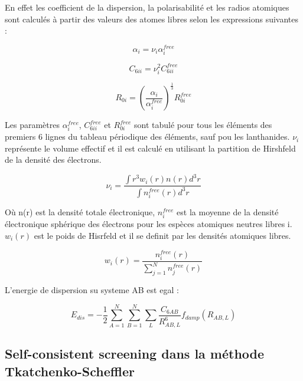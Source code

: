 	En effet les coefficient de la dispersion, la polarisabilité et les radios atomiques sont calculés à partir des valeurs des atomes libres selon les expressions suivantes :
	
	\begin{equation}
	\alpha_{i} = \nu_{i} \alpha_{i}^{free}
	\end{equation}
	
	\begin{equation}
	C_{6ii} = \nu_{i}^{2} C_{6ii}^{free}
	\end{equation}
	
	\begin{equation}
	R_{0i} = \left(\frac{\alpha_{i}}{\alpha_{i}^{free}}\right)^{\frac{1}{3}} R_{0i}^{free}
	\end{equation}
	
	Les paramètres $\alpha_{i}^{free}$, $C_{6ii}^{free}$ et $R_{0i}^{free}$ sont tabulé pour tous les éléments des premiers 6 lignes du tableau périodique des éléments, sauf pou les lanthanides. $\nu_{i}$ représente le volume effectif et il est calculé en utilisant la partition de Hirshfeld de la densité des électrons. 
	
	\begin{equation}
	\nu_{i} = \frac{\int r^{3} w_{i}(r)n(r)d^{3}r}{\int n_{i}^{free} (r)d^{3}r}
	\end{equation}
	
	Où n(r) est la densité totale électronique, $n_{i}^{free}$ est la moyenne de la densité électronique sphérique des électrons pour les espèces atomiques neutres libres i. $w_{i}(r)$ est le poids de Hisrfeld et il se definit par les densités atomiques libres.
	
	\begin{equation}
	w_{i}(r)= \frac{n_{i}^{free}(r)}{\sum_{j=1}^{N} n_{j}^{free}(r)}
	\end{equation}
	\bigskip
	
	L'energie de dispersion su systeme AB est egal : 
	
	\begin{equation}
	E_{dis}= -\frac{1}{2} \sum_{A=1}^{N} \sum_{B=1}^{N} \sum_{L} \frac{C_{6AB}}{R^{6}_{AB,L}} f_{damp}(R_{AB,L})
	\end{equation}
	\bigskip
	
	\subsection{Self-consistent screening dans la méthode Tkatchenko-Scheffler}
	
